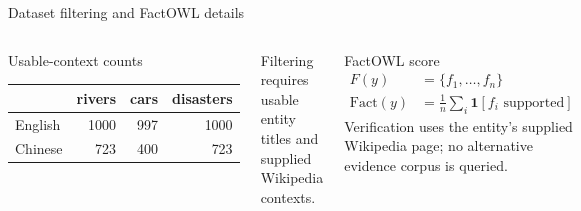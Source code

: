 \documentclass[aspectratio=169,10pt]{beamer}
\begin{document}
\begin{frame}{Dataset filtering and FactOWL details}
  \begin{columns}[T,onlytextwidth]
      \begin{block}{Usable-context counts}\small
        \color{ink}
        \begin{tabular}{@{}lrrr@{}}
          \toprule
          & rivers & cars & disasters\\
          \midrule
          English & 1000 & 997 & 1000\\
          Chinese & 723 & 400 & 723\\
          \bottomrule
        \end{tabular}
      \end{block}
      \vspace{5pt}
      \small Filtering requires usable entity titles and supplied Wikipedia contexts.
      \begin{block}{FactOWL score}\small
        \begin{align*}
          F(y) &= \{f_1,\ldots,f_n\}\\[-2pt]
          \mathrm{Fact}(y) &= \frac{1}{n}\sum_i\mathbf{1}[f_i\text{ supported}]
        \end{align*}
        Verification uses the entity's supplied Wikipedia page; no alternative evidence corpus is queried.
      \end{block}
  \end{columns}
\end{frame}
\end{document}
